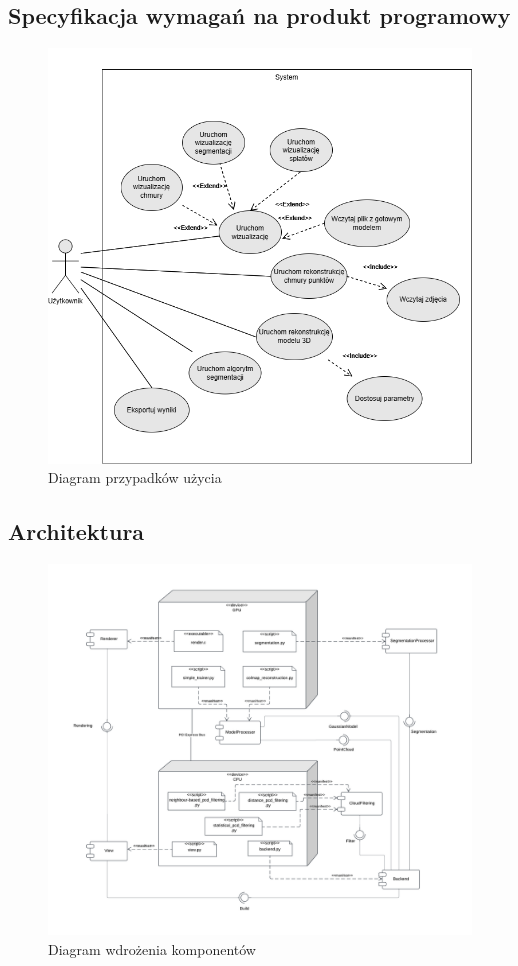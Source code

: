 \subsection{Specyfikacja wymagań na produkt programowy}

\begin{figure}[!htb]
    \includegraphics[width=1.0\linewidth]{img/diagramy/zpi use case.png}
    \caption{Diagram przypadków użycia}\label{fig:use_case_diagram}
  \end{figure}

\subsection{Architektura}

\begin{figure}[!htb]
    \includegraphics[width=1.0\linewidth]{img/diagramy/diagram_wdrozenia_komponentow_3.png}
    \caption{Diagram wdrożenia komponentów}\label{fig:components_diagram}
\end{figure}


